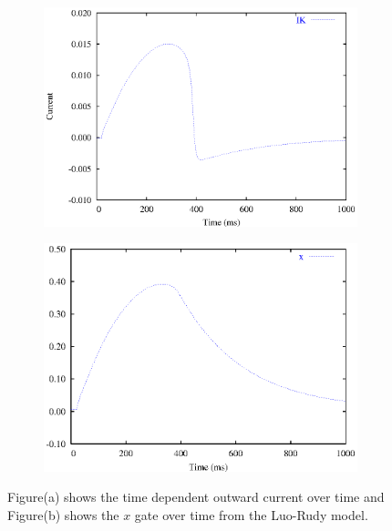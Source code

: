 \begin{figure}[hbtp] 
  \centering
  \begin{subfigure}[b]{0.45\linewidth}
    \centering
    \includegraphics[width=\textwidth]{cardiac_electrophysiology/epsfiles/LR_IK.eps}
    \caption{}
  \end{subfigure}
  \hfill
  \begin{subfigure}[b]{0.45\linewidth}
    \centering
    \includegraphics[width=\textwidth]{cardiac_electrophysiology/epsfiles/LR_Xgate.eps}
    \caption{}
  \end{subfigure}
  \caption[Time dependent outward current from the Luo-Rudy model]{Figure(a) shows the
    time dependent outward current over time and Figure(b) shows the $x$ gate
    over time from the Luo-Rudy model.}
  \label{fig:LR_IK_traces}
\end{figure}
%
